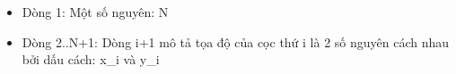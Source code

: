 \begin{itemize}
	\item     Dòng 1: Một số nguyên: N   
	\item     Dòng 2..N+1: Dòng i+1 mô tả tọa độ của cọc thứ i là 2 số nguyên         cách nhau bởi dấu cách: x\_i và y\_i   
\end{itemize}